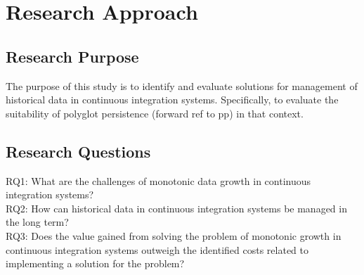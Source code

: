\chapter{Research Approach}
\label{chap:research}

\section{Research Purpose}

The purpose of this study is to identify and evaluate solutions for management of historical data in continuous integration systems. Specifically, to evaluate the suitability of polyglot persistence (forward ref to pp) in that context.

\section{Research Questions}
RQ1: What are the challenges of monotonic data growth in continuous integration systems? \\
RQ2: How can historical data in continuous integration systems be managed in the long term? \\
RQ3: Does the value gained from solving the problem of monotonic growth in continuous integration systems outweigh the identified costs related to implementing a solution for the problem? \\


%

